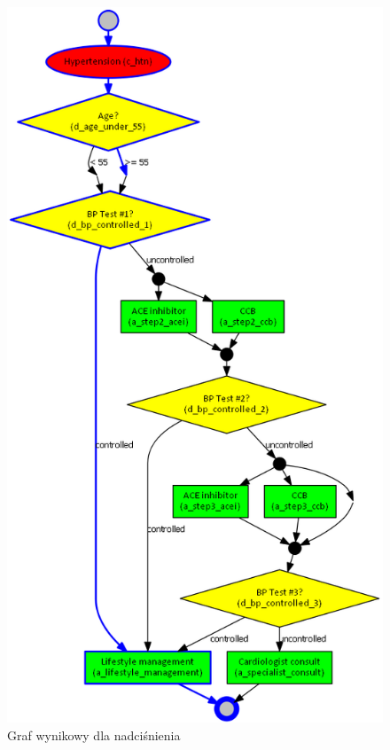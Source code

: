 \begin{figure}[H]
\centering
\includegraphics[scale=0.5]{img/rozwiazanie1htn-ver-3.png}
\caption{Graf wynikowy dla nadciśnienia}
\label{fig:rozw_htn}
\end{figure}


\newpage
